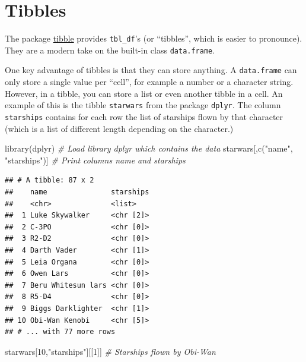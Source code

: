 \documentclass[
]{book}
\newenvironment{Shaded}{\begin{snugshade}}{\end{snugshade}}
\newcommand{\CommentTok}[1]{\textcolor[rgb]{0.56,0.35,0.01}{\textit{#1}}}
\newcommand{\DecValTok}[1]{\textcolor[rgb]{0.00,0.00,0.81}{#1}}
\newcommand{\FunctionTok}[1]{\textcolor[rgb]{0.00,0.00,0.00}{#1}}
\newcommand{\NormalTok}[1]{#1}
\newcommand{\StringTok}[1]{\textcolor[rgb]{0.31,0.60,0.02}{#1}}
\begin{document}
\hypertarget{tibbles}{%
\section{Tibbles}\label{tibbles}}

The package \href{https://cran.r-project.org/web/packages/tibble/}{tibble} provides \texttt{tbl\_df}'s (or ``tibbles'', which is easier to pronounce). They are a modern take on the built-in class \texttt{data.frame}.

One key advantage of tibbles is that they can store anything. A \texttt{data.frame} can only store a single value per ``cell'', for example a number or a character string. However, in a tibble, you can store a list or even another tibble in a cell. An example of this is the tibble \texttt{starwars} from the package \texttt{dplyr}. The column \texttt{starships} contains for each row the list of starships flown by that character (which is a list of different length depending on the character.)

\begin{Shaded}
\begin{Highlighting}[]
\FunctionTok{library}\NormalTok{(dplyr)                             }\CommentTok{\# Load library dplyr which contains the data}
\NormalTok{starwars[,}\FunctionTok{c}\NormalTok{(}\StringTok{"name"}\NormalTok{, }\StringTok{"starships"}\NormalTok{)]          }\CommentTok{\# Print columns name and starships}
\end{Highlighting}
\end{Shaded}

\begin{verbatim}
## # A tibble: 87 x 2
##    name               starships
##    <chr>              <list>   
##  1 Luke Skywalker     <chr [2]>
##  2 C-3PO              <chr [0]>
##  3 R2-D2              <chr [0]>
##  4 Darth Vader        <chr [1]>
##  5 Leia Organa        <chr [0]>
##  6 Owen Lars          <chr [0]>
##  7 Beru Whitesun lars <chr [0]>
##  8 R5-D4              <chr [0]>
##  9 Biggs Darklighter  <chr [1]>
## 10 Obi-Wan Kenobi     <chr [5]>
## # ... with 77 more rows
\end{verbatim}

\begin{Shaded}
\begin{Highlighting}[]
\NormalTok{starwars[}\DecValTok{10}\NormalTok{,}\StringTok{"starships"}\NormalTok{][[}\DecValTok{1}\NormalTok{]]              }\CommentTok{\# Starships flown by Obi{-}Wan}
\end{Highlighting}
\end{Shaded}
\end{document}
